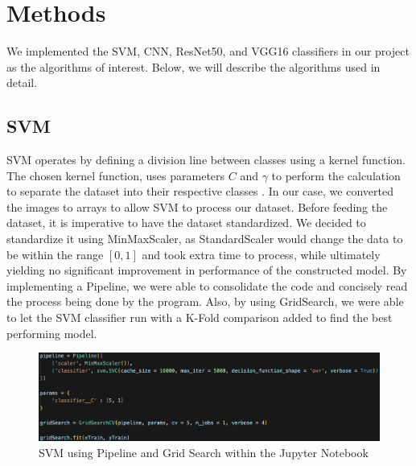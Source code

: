 \graphicspath{ {project_images/} }

\section{Methods}

We implemented the SVM, CNN, ResNet50, and VGG16 classifiers in our project as the algorithms of interest.
Below, we will describe the algorithms used in detail.

\subsection{SVM}
SVM operates by defining a division line between classes using a kernel function. 
The chosen kernel function, uses parameters $C$ and $\gamma$ to perform the calculation to separate the dataset into their respective classes \cite{SVMExplained, SVMExplained2}.
In our case, we converted the images to arrays to allow SVM to process our dataset.
Before feeding the dataset, it is imperative to have the dataset standardized.
We decided to standardize it using MinMaxScaler, as StandardScaler would change the data to be within the range $[0,1]$ and took extra time to process, while ultimately yielding no significant improvement in performance of the constructed model.
By implementing a Pipeline, we were able to consolidate the code and concisely read the process being done by the program.
Also, by using GridSearch, we were able to let the SVM classifier run with a K-Fold comparison added to find the best performing model.

\begin{figure}[h]
	\centering
	\includegraphics[scale=0.3]{SVM_explained.png}
	\caption{SVM using Pipeline and Grid Search within the Jupyter Notebook}
	\label{fig:figure2}
\end{figure}

